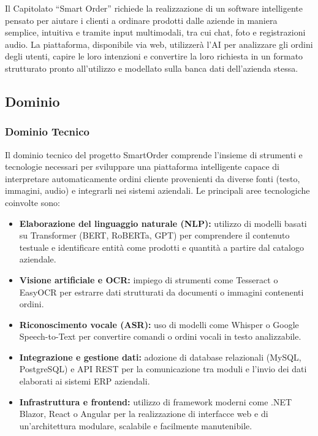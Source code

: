 \documentclass[a4paper,12pt]{article}
\begin{document}
Il Capitolato ``Smart Order'' richiede la realizzazione di un software intelligente pensato per aiutare i clienti a ordinare prodotti dalle aziende in maniera semplice, intuitiva e tramite input multimodali, tra cui chat, foto e registrazioni audio. La piattaforma, disponibile via web, utilizzerà l’AI per analizzare gli ordini degli utenti, capire le loro intenzioni e convertire la loro richiesta in un formato strutturato pronto all’utilizzo e modellato sulla banca dati dell’azienda stessa.

\subsection{Dominio}

\subsubsection{Dominio Tecnico}
Il dominio tecnico del progetto SmartOrder comprende l’insieme di strumenti e tecnologie necessari per sviluppare una piattaforma intelligente capace di interpretare automaticamente ordini cliente provenienti da diverse fonti (testo, immagini, audio) e integrarli nei sistemi aziendali. Le principali aree tecnologiche coinvolte sono:

\begin{itemize}
    \item \textbf{Elaborazione del linguaggio naturale (NLP):} utilizzo di modelli basati su Transformer (BERT, RoBERTa, GPT) per comprendere il contenuto testuale e identificare entità come prodotti e quantità a partire dal catalogo aziendale.
    \item \textbf{Visione artificiale e OCR:} impiego di strumenti come Tesseract o EasyOCR per estrarre dati strutturati da documenti o immagini contenenti ordini.
    \item \textbf{Riconoscimento vocale (ASR):} uso di modelli come Whisper o Google Speech-to-Text per convertire comandi o ordini vocali in testo analizzabile.
    \item \textbf{Integrazione e gestione dati:} adozione di database relazionali (MySQL, PostgreSQL) e API REST per la comunicazione tra moduli e l’invio dei dati elaborati ai sistemi ERP aziendali.
    \item \textbf{Infrastruttura e frontend:} utilizzo di framework moderni come .NET Blazor, React o Angular per la realizzazione di interfacce web e di un’architettura modulare, scalabile e facilmente manutenibile.
\end{itemize}
\end{document}
